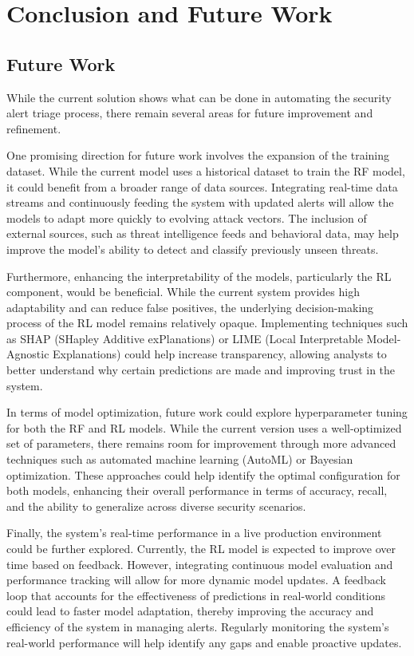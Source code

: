 \chapter{Conclusion and Future Work}
\label{chap:Chapter5}

\section{Future Work}

While the current solution shows what can be done in automating the security alert triage process, there remain several areas for future improvement and refinement. 

One promising direction for future work involves the expansion of the training dataset. 
While the current model uses a historical dataset to train the RF model, it could benefit from a broader range of data sources. 
Integrating real-time data streams and continuously feeding the system with updated alerts will allow the models to adapt more quickly to evolving attack vectors. 
The inclusion of external sources, such as threat intelligence feeds and behavioral data, may help improve the model's ability to detect and classify previously unseen threats.

Furthermore, enhancing the interpretability of the models, particularly the RL component, would be beneficial. 
While the current system provides high adaptability and can reduce false positives, the underlying decision-making process of the RL model remains relatively opaque. 
Implementing techniques such as SHAP (SHapley Additive exPlanations) or LIME (Local Interpretable Model-Agnostic Explanations) could help increase transparency, allowing analysts to better understand why certain predictions are made and improving trust in the system.

In terms of model optimization, future work could explore hyperparameter tuning for both the RF and RL models. 
While the current version uses a well-optimized set of parameters, there remains room for improvement through more advanced techniques such as automated machine learning (AutoML) or Bayesian optimization. 
These approaches could help identify the optimal configuration for both models, enhancing their overall performance in terms of accuracy, recall, and the ability to generalize across diverse security scenarios.

Finally, the system's real-time performance in a live production environment could be further explored. 
Currently, the RL model is expected to improve over time based on feedback. 
However, integrating continuous model evaluation and performance tracking will allow for more dynamic model updates. 
A feedback loop that accounts for the effectiveness of predictions in real-world conditions could lead to faster model adaptation, thereby improving the accuracy and efficiency of the system in managing alerts. 
Regularly monitoring the system's real-world performance will help identify any gaps and enable proactive updates.

